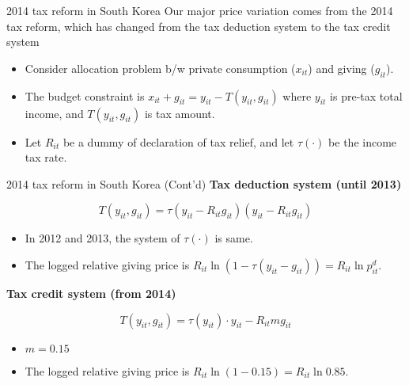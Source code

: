 \documentclass[
  ignorenonframetext,
  aspectratio=169,
]{beamer}
\providecommand{\tightlist}{%
  \setlength{\itemsep}{0pt}\setlength{\parskip}{0pt}}
\begin{document}
\begin{frame}{2014 tax reform in South Korea}
\protect\hypertarget{tax-reform-in-south-korea}{}
Our major price variation comes from the 2014 tax reform, which has changed from the tax deduction system to the tax credit system

\begin{itemize}
\tightlist
\item
  Consider allocation problem b/w private consumption (\(x_{it}\)) and giving (\(g_{it}\)).
\item
  The budget constraint is \(x_{it} + g_{it} = y_{it} - T(y_{it}, g_{it})\) where \(y_{it}\) is pre-tax total income, and \(T(y_{it}, g_{it})\) is tax amount.
\item
  Let \(R_{it}\) be a dummy of declaration of tax relief, and let \(\tau(\cdot)\) be the income tax rate.
\end{itemize}
\end{frame}

\begin{frame}{2014 tax reform in South Korea (Cont'd)}
\protect\hypertarget{tax-reform-in-south-korea-contd}{}
\textbf{Tax deduction system (until 2013)}

\[T(y_{it}, g_{it}) = \tau(y_{it} - R_{it} g_{it}) (y_{it} - R_{it} g_{it})\]

\begin{itemize}
\tightlist
\item
  In 2012 and 2013, the system of \(\tau(\cdot)\) is same.
\item
  The logged relative giving price is \(R_{it} \ln(1 - \tau(y_{it} - g_{it})) = R_{it} \ln p^d_{it}\).
\end{itemize}

\textbf{Tax credit system (from 2014)}

\[T(y_{it}, g_{it}) = \tau(y_{it}) \cdot y_{it} - R_{it} m g_{it}\]

\begin{itemize}
\tightlist
\item
  \(m = 0.15\)
\item
  The logged relative giving price is \(R_{it} \ln(1 - 0.15) = R_{it} \ln 0.85\).
\end{itemize}
\end{frame}
\end{document}
